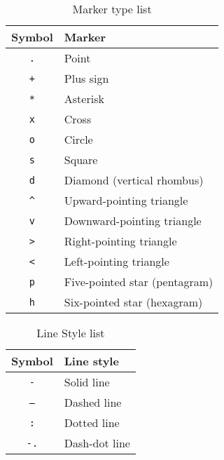 \begin{table}[htp]
\caption{Marker type list}
\label{markertype}
\begin{center}
\begin{tabular}{|c|l|}
\hline
\textbf{Symbol} & \textbf{Marker}\\
\hline
\texttt{.}  & Point\\
\texttt{+}  & Plus sign\\
\texttt{*}  & Asterisk\\
\texttt{x}  & Cross\\
\texttt{o}  & Circle\\
\texttt{s}  & Square\\
\texttt{d}  & Diamond (vertical rhombus)\\
\texttt{\textasciicircum} & Upward-pointing triangle\\
\texttt{v}  & Downward-pointing triangle\\
\texttt{\textgreater} & Right-pointing triangle\\
\texttt{\textless} & Left-pointing triangle\\
\texttt{p}  & Five-pointed star (pentagram)\\
\texttt{h}  & Six-pointed star (hexagram)\\
\hline
\end{tabular}
\end{center}
\end{table}


\begin{table}[htp]
\caption{Line Style list}
\label{linestyle}
\begin{center}
\begin{tabular}{|c|l|}
\hline
\textbf{Symbol} & \textbf{Line style}\\
\hline
\texttt{-}  & Solid line\\
\texttt{--}  & Dashed line\\
\texttt{:}  & Dotted line\\
\texttt{-.}  & Dash-dot line\\
\hline
\end{tabular}
\end{center}
\end{table}


